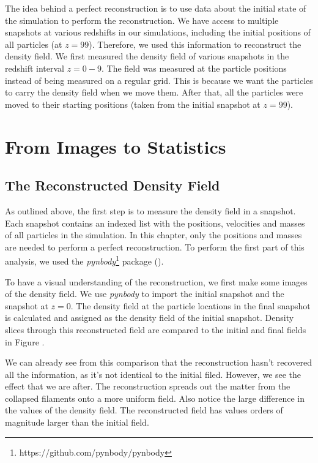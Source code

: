 
The idea behind a perfect reconstruction is to use data about the initial state of the simulation to perform the reconstruction. We have access to multiple snapshots at various redshifts in our simulations, including the initial positions of all particles (at $z = 99$). Therefore, we used this information to reconstruct the density field. We first measured the density field of various snapshots in the redshift interval $z = 0 - 9$. The field was measured at the particle positions instead of being measured on a regular grid. This is because we want the particles to carry the density field when we move them. After that, all the particles were moved to their starting positions (taken from the initial snapshot at $z = 99$).




\section{From Images to Statistics}


\subsection{The Reconstructed Density Field}

As outlined above, the first step is to measure the density field in a snapshot. Each snapshot contains an indexed list with the positions, velocities and masses of all particles in the simulation. In this chapter, only the positions and masses are needed to perform a perfect reconstruction. To perform the first part of this analysis, we used the \textit{pynbody}\footnote{https://github.com/pynbody/pynbody} package (\cite{2013ascl.soft05002P}). 

To have a visual understanding of the reconstruction, we first make some images of the density field. We use \textit{pynbody} to import the initial snapshot and the snapshot at $z=0$. The density field at the particle locations in the final snapshot is calculated and assigned as the density field of the initial snapshot. Density slices through this reconstructed field are compared to the initial and final fields in Figure . 

We can already see from this comparison that the reconstruction hasn't recovered all the information, as it's not identical to the initial filed. However, we see the effect that we are after. The reconstruction spreads out the matter from the collapsed filaments onto a more uniform field. Also notice the large difference in the values of the density field. The reconstructed field has values  orders of magnitude larger than the initial field.

